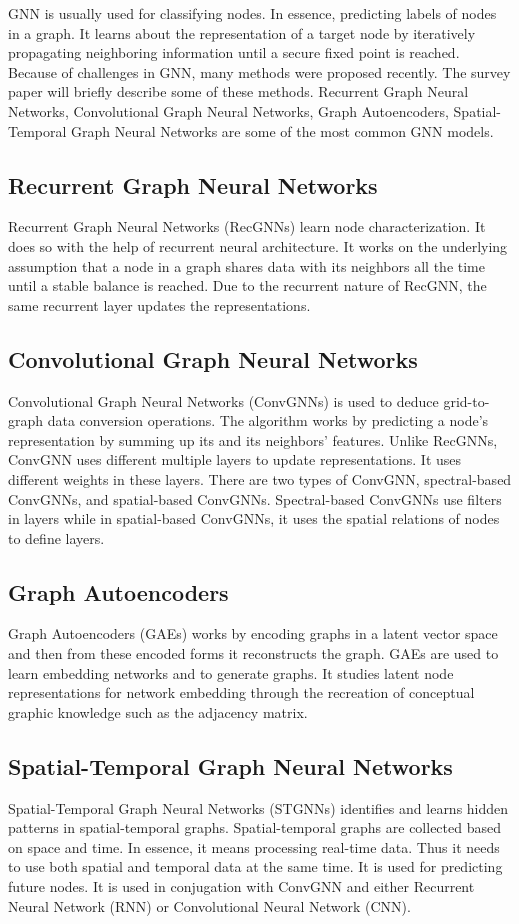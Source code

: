 \documentclass[journal,twoside,web]{ieeecolor}
\begin{document}
GNN is usually used for classifying nodes. In essence, predicting labels of nodes in a graph. It learns about the representation of a target node by iteratively propagating neighboring information until a secure fixed point is reached. Because of challenges in GNN, many methods were proposed recently. The survey paper will briefly describe some of these methods. Recurrent Graph Neural Networks, Convolutional Graph Neural Networks, Graph Autoencoders, Spatial-Temporal Graph Neural Networks are some of the most common GNN models\cite{33}.

\subsection{Recurrent Graph Neural Networks}
Recurrent Graph Neural Networks (RecGNNs) learn node characterization. It does so with the help of recurrent neural architecture. It works on the underlying assumption that a node in a graph shares data with its neighbors all the time until a stable balance is reached. Due to the recurrent nature of RecGNN, the same recurrent layer updates the representations.

\subsection{Convolutional Graph Neural Networks}
Convolutional Graph Neural Networks (ConvGNNs) is used to deduce grid-to-graph data conversion operations. The algorithm works by predicting a node's representation by summing up its and its neighbors' features. Unlike RecGNNs, ConvGNN uses different multiple layers to update representations. It uses different weights in these layers. There are two types of ConvGNN, spectral-based ConvGNNs, and spatial-based ConvGNNs. Spectral-based ConvGNNs use filters in layers while in spatial-based ConvGNNs, it uses the spatial relations of nodes to define layers.

\subsection{Graph Autoencoders}
Graph Autoencoders (GAEs) works by encoding graphs in a latent vector space and then from these encoded forms it reconstructs the graph. GAEs are used to learn embedding networks and to generate graphs. It studies latent node representations for network embedding through the recreation of conceptual graphic knowledge such as the adjacency matrix.

\subsection{Spatial-Temporal Graph Neural Networks}
Spatial-Temporal Graph Neural Networks (STGNNs) identifies and learns hidden patterns in spatial-temporal graphs. Spatial-temporal graphs are collected based on space and time. In essence, it means processing real-time data. Thus it needs to use both spatial and temporal data at the same time. It is used for predicting future nodes. It is used in conjugation with ConvGNN and either Recurrent Neural Network (RNN) or Convolutional Neural Network (CNN).
\end{document}
